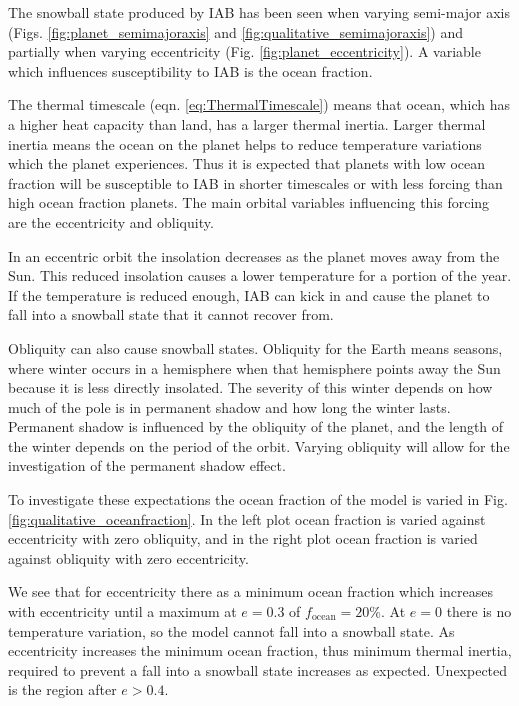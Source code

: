 \documentclass[12pt, onecolumn]{revtex4-2}    %
\begin{document}
The snowball state produced by IAB has been seen when varying semi-major axis (Figs. \ref{fig:planet_semimajoraxis} and \ref{fig:qualitative_semimajoraxis}) and partially when varying eccentricity (Fig. \ref{fig:planet_eccentricity}).
A variable which influences susceptibility to IAB is the ocean fraction.

The thermal timescale (eqn. \eqref{eq:ThermalTimescale}) means that ocean, which has a higher heat capacity than land, has a larger thermal inertia.
Larger thermal inertia means the ocean on the planet helps to reduce temperature variations which the planet experiences.
Thus it is expected that planets with low ocean fraction will be susceptible to IAB in shorter timescales or with less forcing than high ocean fraction planets.
The main orbital variables influencing this forcing are the eccentricity and obliquity.

In an eccentric orbit the insolation decreases as the planet moves away from the Sun.
This reduced insolation causes a lower temperature for a portion of the year.
If the temperature is reduced enough, IAB can kick in and cause the planet to fall into a snowball state that it cannot recover from.

Obliquity can also cause snowball states.
Obliquity for the Earth means seasons, where winter occurs in a hemisphere when that hemisphere points away the Sun because it is less directly insolated.
The severity of this winter depends on how much of the pole is in permanent shadow and how long the winter lasts.
Permanent shadow is influenced by the obliquity of the planet, and the length of the winter depends on the period of the orbit.
Varying obliquity will allow for the investigation of the permanent shadow effect.

To investigate these expectations the ocean fraction of the model is varied in Fig. \ref{fig:qualitative_oceanfraction}.
In the left plot ocean fraction is varied against eccentricity with zero obliquity, and in the right plot ocean fraction is varied against obliquity with zero eccentricity.

We see that for eccentricity there as a minimum ocean fraction which increases with eccentricity until a maximum at $e=0.3$ of $f_\text{ocean} = 20\%$.
At $e=0$ there is no temperature variation, so the model cannot fall into a snowball state.
As eccentricity increases the minimum ocean fraction, thus minimum thermal inertia, required to prevent a fall into a snowball state increases as expected.
Unexpected is the region after $e > 0.4$.
\end{document}
